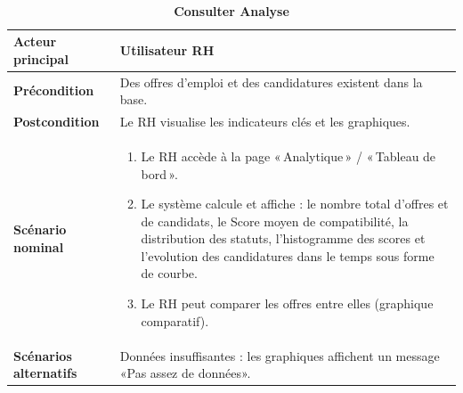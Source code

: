 \documentclass[12pt,a4paper,oneside]{report}
\begin{document}
\begin{itemize}
\begin{table}[H]
\centering
\caption{\textbf{Consulter Analyse}} \\
\vspace{0.3cm}
\begin{tabular}{|p{3.5cm}|p{11cm}|}
\hline
\textbf{Acteur principal} & Utilisateur RH \\
\hline
\textbf{Précondition} & Des offres d’emploi et des candidatures existent dans la base. \\
\hline
\textbf{Postcondition} & Le RH visualise les indicateurs clés et les graphiques. \\
\hline
\textbf{Scénario nominal} &
\begin{minipage}[t]{10.5cm}
\begin{enumerate}
    \item Le RH accède à la page « Analytique » / « Tableau de bord ».
    \item Le système calcule et affiche : le nombre total d’offres et de candidats, le Score moyen de compatibilité, la distribution des statuts, l'histogramme des scores et l'evolution des candidatures dans le temps sous forme de courbe.
        
    \item Le RH peut comparer les offres entre elles (graphique comparatif).
\end{enumerate}
\end{minipage} \\
\hline
\textbf{Scénarios alternatifs} &
\begin{minipage}[t]{10.5cm}
Données insuffisantes : les graphiques affichent un message «Pas assez de données».
\end{minipage} \\
\hline
\end{tabular}

\end{table}


\end{itemize}
\end{document}

